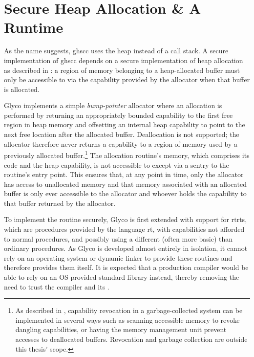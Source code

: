 \documentclass[main.tex]{subfiles}
\begin{document}
\section{Secure Heap Allocation \& A Runtime}
As the name suggests, \acrlong{ghscc} uses the heap instead of a call stack. A secure implementation of \gls{ghscc} depends on a secure implementation of heap allocation as described in \cite[section~7.1]{cerise}: a region of memory belonging to a heap-allocated buffer must only be accessible to  via the capability provided by the allocator when that buffer is allocated.

Glyco implements a simple \emph{bump-pointer} allocator where an allocation is performed by returning an appropriately bounded capability to the first free region in heap memory and offsetting an internal heap capability to point to the next free location after the allocated buffer. Deallocation is not supported; the allocator therefore never returns a capability to a region of memory used by a previously allocated buffer.\footnote{As described in \cite[section~2.3.16]{cheri}, capability revocation in a garbage-collected system can be implemented in several ways such as scanning accessible memory to revoke dangling capabilities, or having the memory management unit prevent accesses to deallocated buffers. Revocation and garbage collection are outside this thesis' scope.} The allocation routine's memory, which comprises its code and the heap capability, is not accessible to  except via a \gls{sentry} to the routine's entry point. This ensures that, at any point in time, only the allocator has access to unallocated memory and that memory associated with an allocated buffer is only ever accessible to the allocator and whoever holds the capability to that buffer returned by the allocator.

To implement the routine securely, Glyco is first extended with support for \glspl{rtrt}, which are procedures provided by the language \gls{rt}, with capabilities not afforded to normal procedures, and possibly using a different (often more basic)  than ordinary procedures. As Glyco is developed almost entirely in isolation, it cannot rely on an operating system or dynamic linker to provide these routines and therefore provides them itself. It is expected that a production compiler would be able to rely on an OS-provided standard library instead, thereby removing the need to trust the compiler and its .

\end{document}
